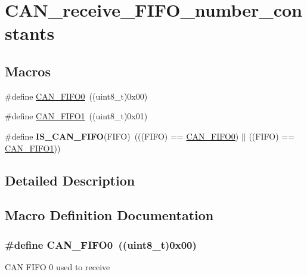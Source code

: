 \hypertarget{group___c_a_n__receive___f_i_f_o__number__constants}{\section{C\-A\-N\-\_\-receive\-\_\-\-F\-I\-F\-O\-\_\-number\-\_\-constants}
\label{group___c_a_n__receive___f_i_f_o__number__constants}
}
\subsection*{Macros}
\begin{DoxyCompactItemize}
\item 
\#define \hyperlink{group___c_a_n__receive___f_i_f_o__number__constants_ga8f52eeefb86b2af5b7c3b4b75fa4d114}{C\-A\-N\-\_\-\-F\-I\-F\-O0}~((uint8\-\_\-t)0x00)
\item 
\#define \hyperlink{group___c_a_n__receive___f_i_f_o__number__constants_gafbcf3f13dbf61030ab7a812595ba9850}{C\-A\-N\-\_\-\-F\-I\-F\-O1}~((uint8\-\_\-t)0x01)
\item 
\hypertarget{group___c_a_n__receive___f_i_f_o__number__constants_gaeeb94bf58bd48b8928f964eaaa20a24a}{\#define {\bfseries I\-S\-\_\-\-C\-A\-N\-\_\-\-F\-I\-F\-O}(F\-I\-F\-O)~(((F\-I\-F\-O) == \hyperlink{group___c_a_n__receive___f_i_f_o__number__constants_ga8f52eeefb86b2af5b7c3b4b75fa4d114}{C\-A\-N\-\_\-\-F\-I\-F\-O0}) $|$$|$ ((F\-I\-F\-O) == \hyperlink{group___c_a_n__receive___f_i_f_o__number__constants_gafbcf3f13dbf61030ab7a812595ba9850}{C\-A\-N\-\_\-\-F\-I\-F\-O1}))}\label{group___c_a_n__receive___f_i_f_o__number__constants_gaeeb94bf58bd48b8928f964eaaa20a24a}

\end{DoxyCompactItemize}


\subsection{Detailed Description}


\subsection{Macro Definition Documentation}
\hypertarget{group___c_a_n__receive___f_i_f_o__number__constants_ga8f52eeefb86b2af5b7c3b4b75fa4d114}{
\subsubsection[{C\-A\-N\-\_\-\-F\-I\-F\-O0}]{\setlength{\rightskip}{0pt plus 5cm}\#define C\-A\-N\-\_\-\-F\-I\-F\-O0~((uint8\-\_\-t)0x00)}}\label{group___c_a_n__receive___f_i_f_o__number__constants_ga8f52eeefb86b2af5b7c3b4b75fa4d114}
C\-A\-N F\-I\-F\-O 0 used to receive 

